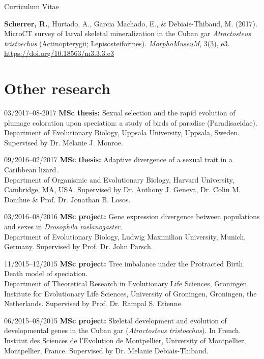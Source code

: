 \documentclass[11pt,a4paper]{article}
\begin{document}
\begin{cv}{Curriculum Vitae}
\begin{cvlist}{}
			\item \textbf{Scherrer, R.}, Hurtado, A., Garcia Machado, E., \& Debiais-Thibaud, M. (2017). MicroCT survey of larval skeletal mineralization in the Cuban gar \textit{Atractosteus tristoechus} (Actinopterygii; Lepisosteiformes). \textit{MorphoMuseuM}, 3(3), e3.\\ \url{https://doi.org/10.18563/m3.3.3.e3}
			
		\end{cvlist}
		
		\section{Other research}
		
		\begin{cvlist}{}
			
			\item[03/2017--08-2017] 
			\textbf{MSc thesis:} Sexual selection and the rapid evolution of plumage coloration upon speciation: a study of birds of paradise (Paradisaeidae).\\ Department of Evolutionary Biology, Uppsala University, Uppsala, Sweden. Supervised by Dr. Melanie J. Monroe.
			
			\item[09/2016--02/2017] 
			\textbf{MSc thesis:} Adaptive divergence of a sexual trait in a Caribbean lizard.\\
			Department of Organismic and Evolutionary Biology, Harvard University, Cambridge, MA, USA.	Supervised by Dr. Anthony J. Geneva, Dr. Colin M. Donihue \& Prof. Dr. Jonathan B. Losos.
			
			\item[03/2016--08/2016] 
			\textbf{MSc project:} Gene expression divergence between populations and sexes in \textit{Drosophila melanogaster}.\\
			Department of Evolutionary Biology, Ludwig Maximilian University, Munich, Germany. Supervised by Prof. Dr. John Parsch.
			
			\item[11/2015--12/2015] 
			\textbf{MSc project:} Tree imbalance under the Protracted Birth Death model of speciation.\\ Department of Theoretical Research in Evolutionary Life Sciences, Groningen Institute for Evolutionary Life Sciences, University of Groningen, Groningen, the Netherlands. Supervised by Prof. Dr. Rampal S. Etienne.
			
			\item[06/2015--08/2015] 
			\textbf{MSc project:} Skeletal development and evolution of developmental genes in the Cuban gar (\textit{Atractosteus tristoechus}). In French.\\ 
			Institut des Sciences de l'Evolution de Montpellier, University of Montpellier, Montpellier, France. Supervised by Dr. Melanie Debiais-Thibaud.
			

\end{cvlist}
\end{cv}
\end{document}
